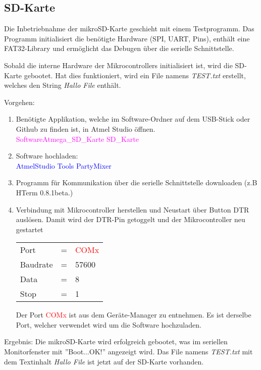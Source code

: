 \subsection{SD-Karte}
\label{subsubsec:Inbetriebnahme_mikroSD_Karte}

Die Inbetriebnahme der mikroSD-Karte geschieht mit einem Testprogramm. Das Programm initialisiert die benötigte Hardware (SPI, UART, Pins), enthält eine FAT32-Library und ermöglicht das Debugen über die serielle Schnittstelle.

Sobald die interne Hardware der Mikrocontrollers initialisiert ist, wird die SD-Karte gebootet. Hat dies funktioniert, wird ein File namens \textit{TEST.txt} erstellt, welches den String \textit{Hallo File} enthält.

Vorgehen:
\begin{enumerate}
\item Benötigte Applikation, welche im Software-Ordner auf dem USB-Stick oder Github \cite{aebi_projekt-6softwareatmega_2020} zu finden ist, in Atmel Studio öffnen.\\
\textcolor{magenta}{Software\textrightarrow Atmega\_SD\_Karte \textrightarrow SD\_Karte}\\

\item Software hochladen:\\
\textcolor{blue}{AtmelStudio \textrightarrow Tools \textrightarrow PartyMixer}\\

\item Programm für Kommunikation über die serielle Schnittstelle downloaden (z.B HTerm 0.8.1beta.)\cite{hammer_hterm_nodate}\\
\item Verbindung mit Mikrocontroller herstellen und Neustart über Button DTR auslösen. Damit wird der DTR-Pin getoggelt und der Mikrocontroller neu gestartet\\

\begin{table}[h!]
\center
\begin{tabular}{lcl}
Port & = & \textcolor{red}{COMx} \\
Baudrate & = & 57600 \\
Data & = & 8 \\
Stop & = & 1 \\
\end{tabular}
\end{table}

Der Port \textcolor{red}{COMx} ist aus dem Geräte-Manager zu entnehmen. Es ist derselbe Port, welcher verwendet wird um die Software hochzuladen.\\

\end{enumerate}

Ergebnis: Die mikroSD-Karte wird erfolgreich gebootet, was im seriellen Monitorfenster mit ''Boot...OK!'' angezeigt wird. Das File namens \textit{TEST.txt} mit dem Textinhalt \textit{Hallo File} ist jetzt auf der SD-Karte vorhanden.